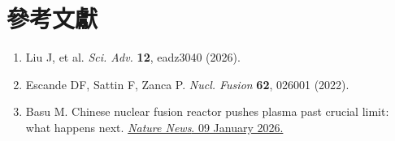 \documentclass[11pt,a4paper]{article}
\begin{document}
\section{參考文獻}

\begin{enumerate}[leftmargin=*,itemsep=3pt]
    \item Liu J, et al. \textit{Sci. Adv.} \textbf{12}, eadz3040 (2026).
    \item Escande DF, Sattin F, Zanca P. \textit{Nucl. Fusion} \textbf{62}, 026001 (2022).
    \item Basu M. Chinese nuclear fusion reactor pushes plasma past crucial limit: what happens next. \href{https://doi.org/10.1038/d41586-026-00063-4}{\textit{Nature News}. 09 January 2026.}
\end{enumerate}
\end{document}
